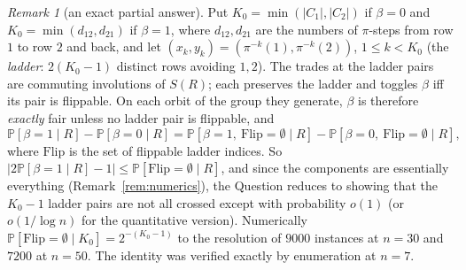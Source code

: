 \documentclass[11pt]{amsart}
\theoremstyle{remark}
\newtheorem{remark}{Remark}
\renewcommand{\Pr}{\mathbb{P}}
\begin{document}
\begin{remark}[an exact partial answer]\label{rem:ladder}
Put $K_0=\min(|C_1|,|C_2|)$ if $\beta=0$ and $K_0=\min(d_{12},d_{21})$
if $\beta=1$, where $d_{12},d_{21}$ are the numbers of $\pi$-steps from
row $1$ to row $2$ and back, and let $(x_k,y_k)=(\pi^{-k}(1),\pi^{-k}(2))$,
$1\le k<K_0$ (the \emph{ladder}: $2(K_0-1)$ distinct rows avoiding
$1,2$).  The trades at the ladder pairs are commuting involutions of
$S(R)$; each preserves the ladder and toggles $\beta$ iff its pair is
flippable.  On each orbit of the group they generate, $\beta$ is
therefore \emph{exactly} fair unless no ladder pair is flippable, and
\[
\Pr[\beta=1\mid R]-\Pr[\beta=0\mid R]
=\Pr[\beta=1,\ \mathrm{Flip}=\emptyset\mid R]-\Pr[\beta=0,\ \mathrm{Flip}=\emptyset\mid R],
\]
where $\mathrm{Flip}$ is the set of flippable ladder indices.  So
$|2\Pr[\beta=1\mid R]-1|\le\Pr[\mathrm{Flip}=\emptyset\mid R]$, and
since the components are essentially everything (Remark~\ref{rem:numerics}),
the Question reduces to showing that the $K_0-1$ ladder pairs are not
all crossed except with probability $o(1)$ (or $o(1/\log n)$ for the
quantitative version).  Numerically $\Pr[\mathrm{Flip}=\emptyset\mid K_0]
=2^{-(K_0-1)}$ to the resolution of $9000$ instances at $n=30$ and
$7200$ at $n=50$.  The identity was verified exactly by enumeration at
$n=7$.
\end{remark}
\end{document}
